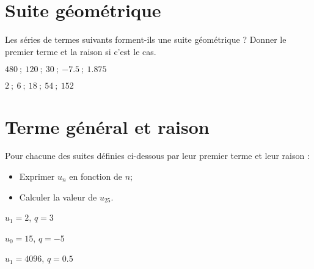 	\section{Suite géométrique}
Les séries de termes suivants forment-ils une suite géométrique ? Donner le premier terme et la raison si c'est le cas.
\begin{questions}
	
	
	\question[2] $\num{480} \: ; \: \num{120} \: ; \: \num{30}  \: ; \:  \num{-7.5} \: ; \: \num{1.875}$ 
	\fillwithdottedlines{3cm}
	
	\question[2] $\num{2} \: ; \:  \num{6} \: ; \: \num{18} \: ; \: \num{54} \: ; \: \num{152}$ 
	\fillwithdottedlines{3cm}
	
	
\end{questions}


\section{Terme général et raison}

Pour chacune des suites définies ci-dessous par leur premier terme et leur raison :
\begin{itemize}
	\item Exprimer $u_n$ en fonction de $n$;
	\item Calculer la valeur de $u_{25}$.
\end{itemize} 
\begin{questions}
	
	
	\question[2] $u_1 = 2$, $q= 3$
	
	\fillwithdottedlines{6cm}
	
	
	\question[2] $u_0 = 15$, $q= -5$
	
	\fillwithdottedlines{6cm}
	
	\question[2] $u_1 = 4096$, $q=\num{0.5}$
	
	\fillwithdottedlines{6cm}
\end{questions}

